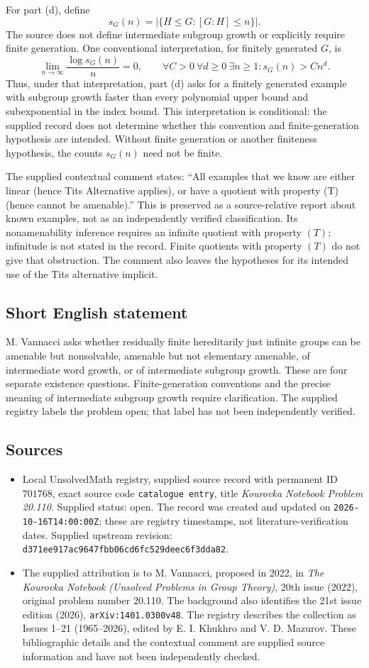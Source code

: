 \documentclass[11pt]{article}
\begin{document}
For part (d), define
\[
s_G(n)=\bigl|\{H\le G:[G:H]\le n\}\bigr|.
\]
The source does not define intermediate subgroup growth or explicitly require finite generation. One conventional interpretation, for finitely generated \(G\), is
\[
\lim_{n\to\infty}\frac{\log s_G(n)}{n}=0,
\qquad
\forall C>0\ \forall d\ge0\ \exists n\ge1:
 s_G(n)>Cn^d.
\]
Thus, under that interpretation, part (d) asks for a finitely generated example with subgroup growth faster than every polynomial upper bound and subexponential in the index bound. This interpretation is conditional: the supplied record does not determine whether this convention and finite-generation hypothesis are intended. Without finite generation or another finiteness hypothesis, the counts \(s_G(n)\) need not be finite.

The supplied contextual comment states: ``All examples that we know are either linear (hence Tits Alternative applies), or have a quotient with property (T) (hence cannot be amenable).'' This is preserved as a source-relative report about known examples, not as an independently verified classification. Its nonamenability inference requires an infinite quotient with property \((T)\); infinitude is not stated in the record. Finite quotients with property \((T)\) do not give that obstruction. The comment also leaves the hypotheses for its intended use of the Tits alternative implicit.
\subsection{Short English statement}
M. Vannacci asks whether residually finite hereditarily just infinite groups can be amenable but nonsolvable, amenable but not elementary amenable, of intermediate word growth, or of intermediate subgroup growth. These are four separate existence questions. Finite-generation conventions and the precise meaning of intermediate subgroup growth require clarification. The supplied registry labels the problem open; that label has not been independently verified.
\subsection{Sources}
\begin{itemize}
\item Local UnsolvedMath registry, supplied source record with permanent ID \(701768\), exact source code \texttt{catalogue entry}, title \emph{Kourovka Notebook Problem 20.110}. Supplied status: open. The record was created and updated on \texttt{2026-10-16T14:00:00Z}; these are registry timestamps, not literature-verification dates. Supplied upstream revision: \texttt{d371ee917ac9647fbb06cd6fc529deec6f3dda82}.
\item The supplied attribution is to M. Vannacci, proposed in 2022, in \emph{The Kourovka Notebook (Unsolved Problems in Group Theory)}, 20th issue (2022), original problem number 20.110. The background also identifies the 21st issue edition (2026), \texttt{arXiv:1401.0300v48}. The registry describes the collection as Issues 1--21 (1965--2026), edited by E. I. Khukhro and V. D. Mazurov. These bibliographic details and the contextual comment are supplied source information and have not been independently checked.
\end{itemize}
\end{document}
